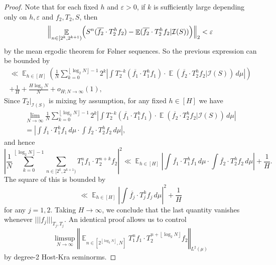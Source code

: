 \documentclass[11pt]{amsart}
\theoremstyle{definition}
\DeclareMathOperator*{\E}{\mathbb{E}}
\newcommand{\CI}{{\mathcal I}}
\newcommand{\e}{\varepsilon}%
\newcommand{\norm}[1]{\left\Vert #1\right\Vert}
\newcommand{\nnorm}[1]{\lvert\!|\!| #1|\!|\!\rvert}
\newcommand{\1}{{\mathbf{1}}}
\newcommand{\abs}[1]{\mathopen{}\left| #1\mathclose{}\right|}
\newcommand{\Bigbrac}[1]{\Bigl( #1 \Bigr)}
\newcommand{\floor}[1]{{\left \lfloor #1 \right \rfloor}}
\begin{document}
\begin{proof}
Note that for each fixed $h$ and $\e>0$, if $k$ is sufficiently large depending only on $h,\e$ and $f_{2}, T_{2}, S$, then 
$$\Bigl\Vert \E_{n\in[2^k,2^{k+1})}\Bigbrac{S^{n}(\overline{f_2}\cdot T_{2}^{h} f_2)-\E(\overline{f_2}\cdot T_{2}^{h} f_2\vert \CI(S))}\Bigr\Vert_{2}<\e$$
by the mean ergodic theorem for F\o lner sequences. So the previous expression can be bounded by 
\begin{multline*}
 \ll\E_{h\in[H]} \left(\frac{1}{N}\sum_{k=0}^{\floor{\log_2 N}-1}2^k \left|\int T_{2}^{-k}(\overline{f_1}\cdot T_{1}^h f_1)\cdot \E(\overline{f_2}\cdot T_{2}^{h} f_2\vert \CI(S)) \, d\mu\right|\right)
         \\+{\frac{1}{H}+\frac{H\log_2 N}{N}}+o_{H;N\to\infty}(1),
    \end{multline*}
    Since $T_{2}\vert_{\CI(S)}$ is mixing by assumption, for any fixed $h\in [H]$ we have
    \begin{multline*}
       \lim_{N\to\infty}\frac{1}{N}\sum_{k=0}^{\floor{\log_2 N}-1}2^k\abs{\int T_{2}^{-k}(\overline{f_1}\cdot T_{1}^h f_1)\cdot \E(\overline{f_2}\cdot T_{2}^{h} f_2\vert \CI(S)) \, d\mu}\\
       =\abs{\int \overline{f_1}\cdot T_{1}^h f_1\, d\mu \cdot\int \overline{f_2}\cdot T_{2}^h f_2\, d\mu},
    \end{multline*} and hence
    \begin{equation*}
         \abs{\frac{1}{N}\sum_{k=0}^{\floor{\log_2 N}-1} \sum_{n\in[2^k,2^{k+1})}T_{1}^n f_1\cdot T_{2}^{n+k}f_2}^2\ll\E_{h\in[H]}\left|\int \overline{f_1}\cdot T_{1}^h f_1\, d\mu \cdot\int \overline{f_2}\cdot T_{2}^h f_2\, d\mu\right|+\frac{1}{H}.
    \end{equation*}
    The square of this is bounded by
    \begin{equation*}
         \ll\E_{h\in[H]}\left|\int \overline{f_j}\cdot T_{j}^h f_j\, d\mu\right|^{2}+\frac{1}{H}
    \end{equation*}
    for any $j=1,2$.
       Taking $H\to\infty$, we conclude that the last quantity vanishes whenever $\nnorm{f_{j}}_{T_{j},T_{j}}$. An identical proof allows us to control $$\limsup\limits_{N\to\infty}\norm{\E_{n\in[2^\floor{\log_2 N}, N]}T_{1}^n f_1\cdot T_{2}^{n+\floor{\log_2 N}}f_2}_{L^2(\mu)}$$ by degree-2 Host-Kra seminorms.    
\end{proof}
\end{document}
